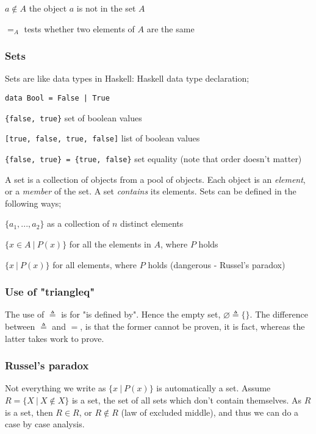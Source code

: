 \documentclass[a4paper, 12pt]{article}
\begin{document}
        $a \notin A$ \hfill the object $a$ is not in the set $A$
        \smallskip

        $=_A$ \hfill tests whether two elements of $A$ are the same
        \subsubsection*{Sets}
        Sets are like data types in Haskell: Haskell data type declaration;
        \medskip

        \texttt{data Bool = False | True}
        \smallskip

        \texttt{\{false, true\}} \hfill set of boolean values
        \smallskip

        \texttt{[true, false, true, false]} \hfill list of boolean values
        \smallskip

        \texttt{\{false, true\} = \{true, false\}} \hfill set equality (note that order doesn't matter)
        \medskip

        A set is a collection of objects from a pool of objects. Each object is an \textit{element}, or a \textit{member} of the set. A set \textit{contains} its elements. Sets can be defined in the following ways;
        \medskip

        $\{a_1, ..., a_2\}$ \hfill as a collection of $n$ distinct elements
        \smallskip

        $\{x \in A\ |\ P(x)\}$ \hfill for all the elements in $A$, where $P$ holds
        \smallskip

        $\{x\ |\ P(x)\}$ \hfill for all elements, where $P$ holds (dangerous - Russel's paradox)
        \subsubsection*{Use of "triangleq"}
        The use of $\triangleq$ is for "is defined by". Hence the empty set, $\varnothing \triangleq \{\}$. The difference between $\triangleq$ and $=$, is that the former cannot be proven, it is fact, whereas the latter takes work to prove.

        \subsubsection*{Russel's paradox}
        Not everything we write as $\{x\ |\ P(x)\}$ is automatically a set. Assume $R = \{X\ |\ X \notin X\}$ is a set, the set of all sets which don't contain themselves. As $R$ is a set, then $R \in R$, or $R \notin R$ (law of excluded middle), and thus we can do a case by case analysis.
\end{document}

